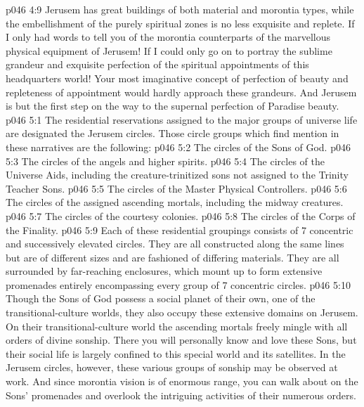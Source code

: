 \vs p046 4:9 Jerusem has great buildings of both material and morontia types, while the embellishment of the purely spiritual zones is no less exquisite and replete. If I only had words to tell you of the morontia counterparts of the marvellous physical equipment of Jerusem! If I could only go on to portray the sublime grandeur and exquisite perfection of the spiritual appointments of this headquarters world! Your most imaginative concept of perfection of beauty and repleteness of appointment would hardly approach these grandeurs. And Jerusem is but the first step on the way to the supernal perfection of Paradise beauty.
\vs p046 5:1 The residential reservations assigned to the major groups of universe life are designated the Jerusem circles. Those circle groups which find mention in these narratives are the following:
\vs p046 5:2 \bibnobreakspace The circles of the Sons of God.
\vs p046 5:3 \bibnobreakspace The circles of the angels and higher spirits.
\vs p046 5:4 \bibnobreakspace The circles of the Universe Aids, including the creature\hyp{}trinitized sons not assigned to the Trinity Teacher Sons.
\vs p046 5:5 \bibnobreakspace The circles of the Master Physical Controllers.
\vs p046 5:6 \bibnobreakspace The circles of the assigned ascending mortals, including the midway creatures.
\vs p046 5:7 \bibnobreakspace The circles of the courtesy colonies.
\vs p046 5:8 \bibnobreakspace The circles of the Corps of the Finality.
\vs p046 5:9 \pc Each of these residential groupings consists of 7 concentric and successively elevated circles. They are all constructed along the same lines but are of different sizes and are fashioned of differing materials. They are all surrounded by far\hyp{}reaching enclosures, which mount up to form extensive promenades entirely encompassing every group of 7 concentric circles.
\vs p046 5:10 \bibnobreakspace {} Though the Sons of God possess a social planet of their own, one of the transitional\hyp{}culture worlds, they also occupy these extensive domains on Jerusem. On their transitional\hyp{}culture world the ascending mortals freely mingle with all orders of divine sonship. There you will personally know and love these Sons, but their social life is largely confined to this special world and its satellites. In the Jerusem circles, however, these various groups of sonship may be observed at work. And since morontia vision is of enormous range, you can walk about on the Sons’ promenades and overlook the intriguing activities of their numerous orders.
